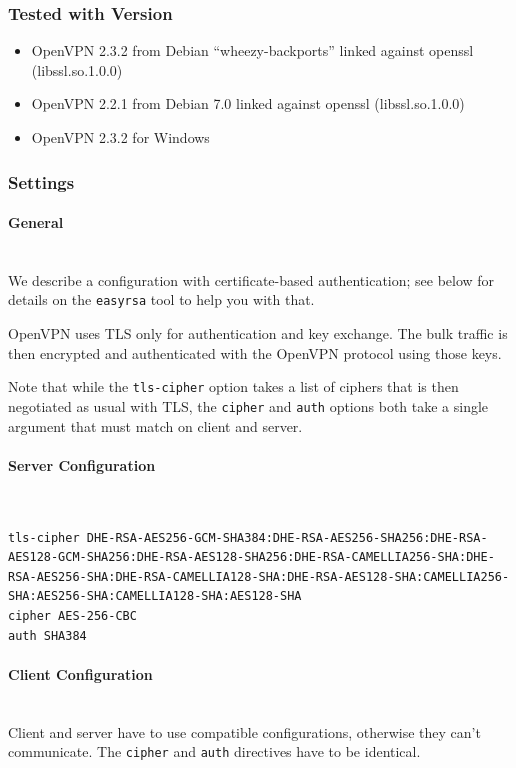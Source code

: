 \subsubsection{Tested with Version}
\begin{itemize}
  \item OpenVPN 2.3.2 from Debian ``wheezy-backports'' linked against openssl (libssl.so.1.0.0) 
  \item OpenVPN 2.2.1 from Debian 7.0 linked against openssl (libssl.so.1.0.0) 
  \item OpenVPN 2.3.2 for Windows
\end{itemize}


\subsubsection{Settings}
\paragraph{General}\mbox{}\\
We describe a configuration with certificate-based authentication; see
below for details on the \verb|easyrsa| tool to help you with that.

OpenVPN uses TLS only for authentication and key exchange. The
bulk traffic is then encrypted and authenticated with the OpenVPN
protocol using those keys.

Note that while the \verb|tls-cipher| option takes a list of ciphers
that is then negotiated as usual with TLS, the \verb|cipher|
and \verb|auth| options both take a single argument that must match on
client and server.

\paragraph{Server Configuration}\mbox{}\\

\begin{lstlisting}
tls-cipher DHE-RSA-AES256-GCM-SHA384:DHE-RSA-AES256-SHA256:DHE-RSA-AES128-GCM-SHA256:DHE-RSA-AES128-SHA256:DHE-RSA-CAMELLIA256-SHA:DHE-RSA-AES256-SHA:DHE-RSA-CAMELLIA128-SHA:DHE-RSA-AES128-SHA:CAMELLIA256-SHA:AES256-SHA:CAMELLIA128-SHA:AES128-SHA
cipher AES-256-CBC
auth SHA384
\end{lstlisting}

\paragraph{Client Configuration}\mbox{}\\
Client and server have to use compatible configurations, otherwise they can't communicate.
The \verb|cipher| and \verb|auth| directives have to be identical.

